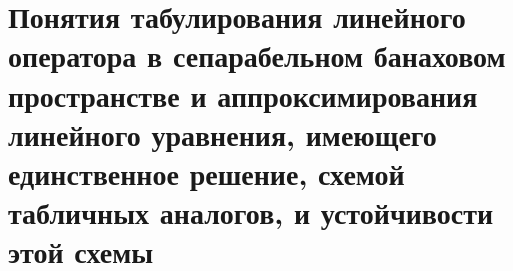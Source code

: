 \documentclass[__main__.tex]{subfiles}
\begin{document}
\section{Понятия табулирования линейного оператора в сепарабельном банаховом пространстве и аппроксимирования линейного уравнения, имеющего единственное решение, схемой табличных аналогов, и устойчивости этой схемы}
\end{document}
